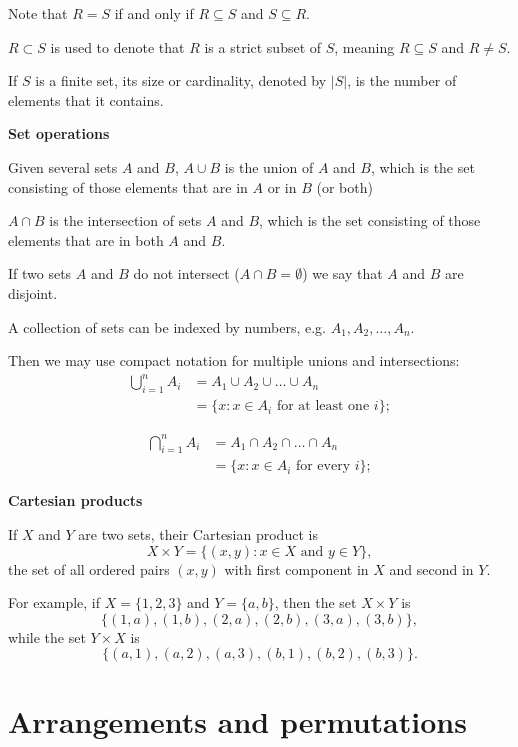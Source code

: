 \documentclass[10pt, a4paper]{article}
\begin{document}
Note that $R = S$ if and only if $R \subseteq S$ and $S \subseteq R$.

$R \subset S$ is used to denote that $R$ is a strict subset of $S$, meaning $R \subseteq S$ and $R \neq S$.

If $S$ is a finite set, its size or cardinality, denoted by $|S|$, is the number of elements that it contains.


\textbf{Set operations}

Given several sets $A$ and $B$, $A \cup B$ is the union of $A$ and $B$, which is the set consisting of those elements that are in $A$ or in $B$ (or both)

$A \cap B$ is the intersection of sets $A$ and $B$, which is the set consisting of those elements that are in both $A$ and $B$.

If two sets $A$ and $B$ do not intersect ($A \cap B = \emptyset$) we say that $A$ and $B$ are disjoint.

A collection of sets can be indexed by numbers, e.g. $A_1, A_2, \dots, A_n$.

Then we may use compact notation for multiple unions and intersections:
\begin{align*}
    \bigcup_{i = 1}^{n}{A_i} &= A_1 \cup A_2 \cup \dots \cup A_n \\
    &= \{x: x \in A_i \text{ for at least one } i\};
\end{align*}

\begin{align*}
    \bigcap_{i = 1}^{n}{A_i} &= A_1 \cap A_2 \cap \dots \cap A_n \\
    &= \{x: x \in A_i \text{ for every } i\};
\end{align*}

\textbf{Cartesian products}

If $X$ and $Y$ are two sets, their Cartesian product is
\[
X \times Y = \{(x, y): x \in X \text{ and } y \in Y\},
\]
the set of all ordered pairs $(x, y)$ with first component in $X$ and second in $Y$.

For example, if $X = \{1, 2, 3\}$ and $Y = \{a, b\}$, then the set $X \times Y$ is
\[
\{(1, a), (1, b), (2, a), (2, b), (3, a), (3, b)\},
\]
while the set $Y \times X$ is
\[
\{(a, 1), (a, 2), (a, 3), (b, 1), (b, 2), (b, 3)\}.
\]

\newpage

\section{Arrangements and permutations}
\end{document}

